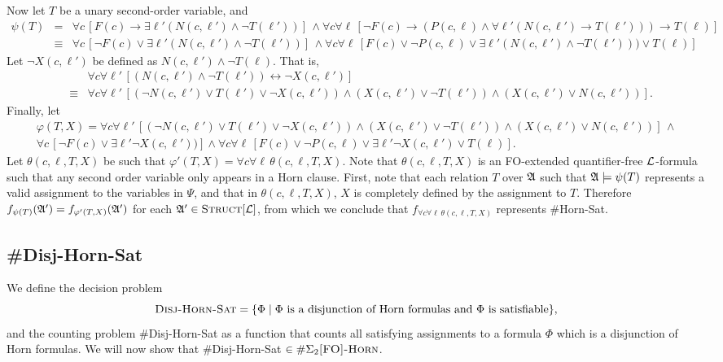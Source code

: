 Now let $T$ be a unary second-order variable, and
\begin{align*}
	\psi(T) &=& \forall c\,[ F(c) \to \exists \ell'(N(c,\ell') \wedge \neg T(\ell'))]
	\,\wedge
	 \forall c \forall \ell\, [\neg F(c)\to(P(c,\ell)\wedge\forall\ell'(N(c,\ell')\to T(\ell')))\to T(\ell)] \\
	 &\equiv& \forall c\,[ \neg F(c) \vee \exists \ell'(N(c,\ell') \wedge \neg T(\ell'))]
	 \,\wedge
	 \forall c \forall \ell\, [ F(c) \vee \neg P(c,\ell) \vee \exists\ell'(N(c,\ell') \wedge \neg T(\ell'))) \vee T(\ell)]
\end{align*}
Let $\neg X(c,\ell')$ be defined as $N(c,\ell')\wedge \neg T(\ell)$. That is,
\begin{eqnarray*}
	&& \forall c \forall \ell'\, [(N(c,\ell') \wedge \neg T(\ell')) \leftrightarrow \neg X(c,\ell')]\\
	&\equiv& \forall c \forall \ell'\,[(\neg N(c,\ell')\vee T(\ell')\vee \neg X(c,\ell'))\wedge (X(c,\ell')\vee \neg T(\ell'))\wedge (X(c,\ell')\vee N(c,\ell'))].
\end{eqnarray*}
Finally, let
\begin{multline*}
	\varphi(T,X) = \forall c \forall \ell'\,[(\neg N(c,\ell')\vee T(\ell')\vee \neg X(c,\ell'))\wedge (X(c,\ell')\vee \neg T(\ell'))\wedge (X(c,\ell')\vee N(c,\ell'))]\,\wedge \\
	\forall c\,[ \neg F(c) \vee \exists \ell'\neg X(c,\ell'))]
	\wedge
	\forall c \forall \ell\, [ F(c) \vee \neg P(c,\ell) \vee \exists\ell'\neg X(c,\ell') \vee T(\ell)].
\end{multline*}
Let $\theta(c,\ell,T,X)$ be such that $\varphi'(T,X) = \forall c \forall \ell\,\theta(c,\ell,T,X)$. Note that $\theta(c,\ell,T,X)$ is an {\sc FO}-extended quantifier-free ${\cal L}$-formula such that any second order variable only appears in a Horn clause. First, note that each relation $T$ over ${\frak A}$ such that ${\frak A}\models \psi(T)$ represents a valid assignment to the variables in $\Psi$, and that in $\theta(c,\ell,T,X)$, $X$ is completely defined by the assignment to $T$. Therefore $f_{\psi(T)}({\frak A}') = f_{\varphi'(T,X)}({\frak A}')$ for each ${\frak A}'\in\textsc{Struct}[{\cal L}]$, from which we conclude that $f_{\forall c \forall \ell\,\theta(c,\ell,T,X)}$ represents {\sc \#Horn-Sat}. 

\subsection{{\sc \#Disj-Horn-Sat}}
We define the decision problem
\[
	\textsc{Disj-Horn-Sat} = \{\Phi \mid \Phi \mbox{ is a disjunction of Horn formulas and $\Phi$ is satisfiable}\},
\]
and the counting problem {\sc \#Disj-Horn-Sat} as a function that counts all satisfying assignments to a formula $\Phi$ which is a disjunction of Horn formulas. We will now show that {\sc \#Disj-Horn-Sat} $\in\#\Sigma_2\textsc{[FO]-Horn}$.

